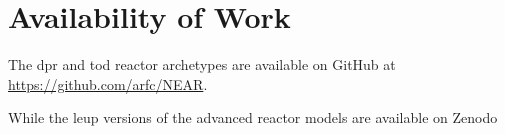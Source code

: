 \chapter{Availability of Work}
\label{sec:avail_work}

The \gls{dpr} and \gls{tod} reactor archetypes are available on GitHub at
\url{https://github.com/arfc/NEAR}.

While the \gls{leup} versions of the advanced reactor models are available on Zenodo


